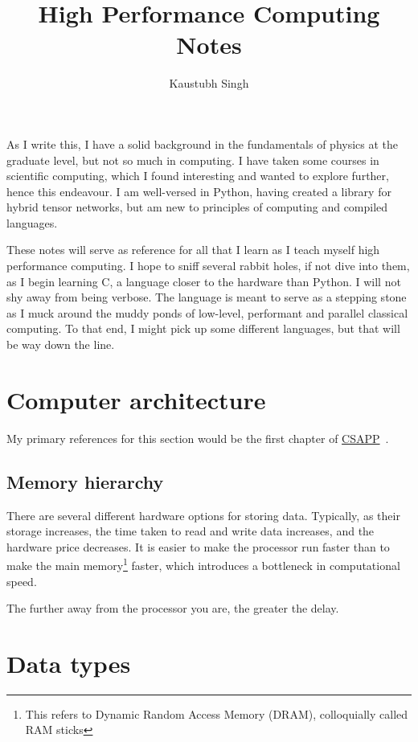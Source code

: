 \documentclass{article}
\title{High Performance Computing Notes}
\author{Kaustubh Singh}
\newcommand{\vs}{
    \vspace{1em}
}
\begin{document}
\maketitle

\begin{center}
    As I write this, I have a solid background in the fundamentals of physics at the graduate level, but not so much in computing. I have taken some courses in scientific computing, which I found interesting and wanted to explore further, hence this endeavour. I am well-versed in Python, having created a library for hybrid tensor networks, but am new to principles of computing and compiled languages. 

    \vs 
    
    These notes will serve as reference for all that I learn as I teach myself high performance computing. I hope to sniff several rabbit holes, if not dive into them, as I begin learning C, a language closer to the hardware than Python. I will not shy away from being verbose. The language is meant to serve as a stepping stone as I muck around the muddy ponds of low-level, performant and parallel classical computing. To that end, I might pick up some different languages, but that will be way down the line. 
\end{center}

\section{Computer architecture}
My primary references for this section would be the first chapter of \href{https://www.cs.sfu.ca/~ashriram/Courses/CS295/assets/books/CSAPP_2016.pdf}{CSAPP}~\cite{csapp}. 

\subsection{Memory hierarchy}
There are several different hardware options for storing data. Typically, as their storage increases, the time taken to read and write data increases, and the hardware price decreases. It is easier to make the processor run faster than to make the main memory\footnote{This refers to Dynamic Random Access Memory (DRAM), colloquially called RAM sticks} faster, which introduces a bottleneck in computational speed.

\vs

The further away from the processor you are, the greater the delay. 

\section{Data types}
\end{document}
